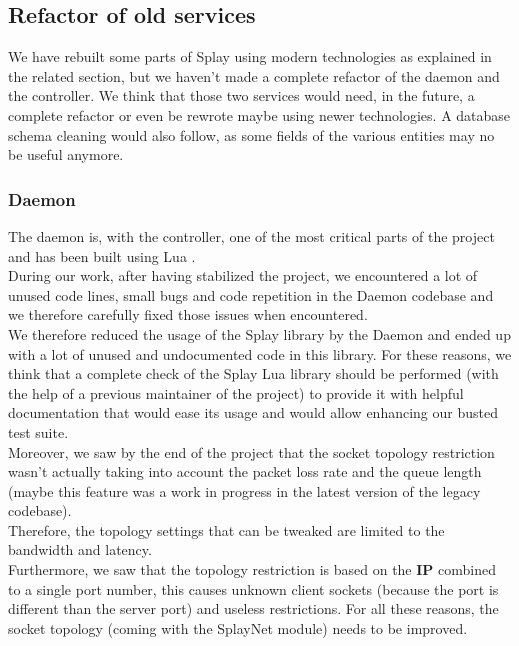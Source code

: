 \documentclass{eplmastersthesis}
\begin{document}
      \subsection{Refactor of old services}

        We have rebuilt some parts of Splay using modern technologies as
        explained in the related section, but we haven't made a complete
        refactor of the daemon and the controller. We think that those two
        services would need, in the future, a complete refactor or even be
        rewrote maybe using newer technologies. A database schema cleaning
        would also follow, as some fields of the various entities may no be
        useful anymore.

        \subsubsection{Daemon}

          The daemon is, with the controller, one of the most critical parts of
          the project and has been built using Lua \cite{Lua}.\\
          During our work, after having stabilized the project, we encountered
          a lot of unused code lines, small bugs and code repetition in the
          Daemon codebase and we therefore carefully fixed those issues when
          encountered.\\
          We therefore reduced the usage of the Splay library by the Daemon
          and ended up with a lot of unused and undocumented code in this
          library. For these reasons, we think that a complete check of the
          Splay Lua library should be performed (with the help of a previous
          maintainer of the project) to provide it with helpful documentation
          that would ease its usage and would allow enhancing our busted test
          suite.\\

          Moreover, we saw by the end of the project that the socket
          topology restriction wasn't actually taking into account
          the packet loss rate and the queue length (maybe this feature was
          a work in progress in the latest version of the legacy codebase).\\
          Therefore, the topology settings that can be tweaked are limited to
          the bandwidth and latency.\\
          Furthermore, we saw that the topology restriction is based on the
          \textbf{IP} combined to a single port number, this causes unknown
          client sockets (because the port is different than the server port)
          and useless restrictions. For all these reasons, the socket topology
          (coming with the SplayNet module) needs to be improved.\\
\end{document}
